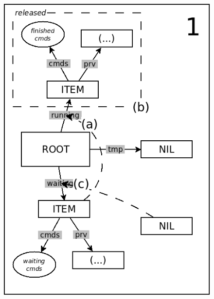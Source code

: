 \documentclass{sig-alternate}
\begin{document}
\begin{figure}
\begin{minipage}[t]{0.24\linewidth}
\includegraphics[scale=0.25]{queue-11.png}
\end{minipage}
\begin{minipage}[t]{0.24\linewidth}
\centering

\end{minipage}
\end{figure}
\end{document}

